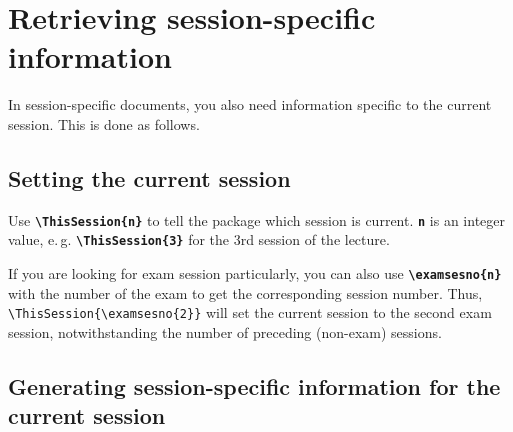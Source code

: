 \documentclass[english]{article}
\newcommand*\jmacro[1]{\textbf{\texttt{#1}}}
\newcommand*\jcsmacro[1]{\jmacro{\textbackslash{#1}}}
\newcommand*\joption[1]{\textbf{\texttt{#1}}}
\newcommand*\jparam[1]{\angus #1\angud}
\begin{document}
\section{Retrieving session-specific information\label{sec:session-specific-info}}

In session-specific documents, you also need information specific
to the current session. This is done as follows.


\subsection{Setting the current session}

Use \jcsmacro{ThisSession\{\jparam{n}\}} to tell the package
which session is current. \joption{\jparam{n}} is an integer value, e.\,g.
\jcsmacro{ThisSession\{3\}} for the 3rd session of the lecture.

If you are looking for exam session particularly, you can also use
\jcsmacro{examsesno\{\jparam{n}\}} with the number of the exam to get the
corresponding session number. Thus, \verb|\ThisSession{\examsesno{2}}|
will set the current session to the second exam session, notwithstanding
the number of preceding (non-exam) sessions.

\subsection{Generating session-specific information for the current session}
\end{document}
